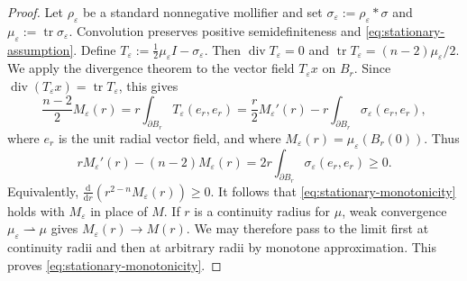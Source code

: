 \documentclass[10pt,a4paper]{amsart}
\renewcommand{\epsilon}{\varepsilon}
\renewcommand{\geq}{\geqslant}
\newcommand{\tr}{\operatorname{tr}}
\begin{document}
\begin{proof}
Let $\rho_\varepsilon$ be a standard nonnegative mollifier and set
$\sigma_\varepsilon:=\rho_\varepsilon*\sigma$ and
$\mu_\varepsilon:=\operatorname{tr}\sigma_\varepsilon$.
Convolution preserves positive semidefiniteness and
\eqref{eq:stationary-assumption}. Define
$
 T_\varepsilon:=\frac12\mu_\varepsilon I-
       \sigma_\varepsilon$.
Then $\operatorname{div}T_\varepsilon=0$ and
$\operatorname{tr}T_\varepsilon=(n-2)\mu_\varepsilon/2$. We apply the divergence
theorem to the vector field $T_\varepsilon x$ on $B_r$. Since $\operatorname{div} (T_\epsilon x) = \tr T_\epsilon$, this gives
\[
 \frac{n-2}{2}M_\varepsilon(r)
 =r\int_{\partial B_r}T_\varepsilon(e_r,e_r)
 =\frac r2M_\varepsilon'(r)
   -r\int_{\partial B_r}
       \sigma_\varepsilon(e_r,e_r),
\]
where $e_r$ is the unit radial vector field, and where $M_\varepsilon(r)=\mu_\epsilon(B_r(0))$. Thus
\begin{equation}
 rM_\varepsilon'(r)-(n-2)M_\varepsilon(r)
 =2r\int_{\partial B_r}
       \sigma_\varepsilon(e_r,e_r)\geq0.
 \label{eq:stationary-derivative}
\end{equation}
Equivalently, $
 \frac{\mathrm{d}}{\mathrm{d}r}\left(r^{2-n}M_\varepsilon(r)\right)\geq0$. 
It follows that \eqref{eq:stationary-monotonicity} holds with
$M_\varepsilon$ in place of $M$.
If $r$ is a continuity radius for $\mu$, weak convergence
$\mu_\varepsilon\rightharpoonup\mu$ gives
$M_\varepsilon(r)\to M(r)$. We may therefore pass to the limit first at
continuity radii and then at arbitrary radii by monotone approximation.
This proves \eqref{eq:stationary-monotonicity}. \end{proof}
\end{document}
